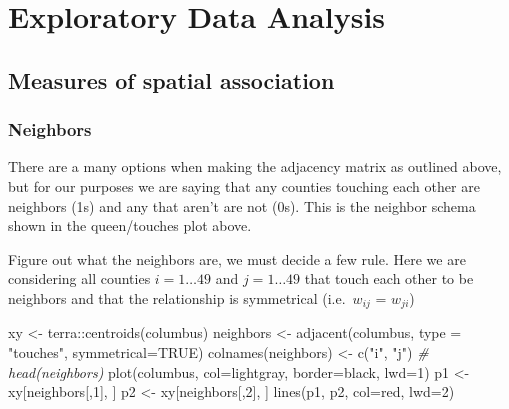 \documentclass[
]{article}
\newenvironment{Shaded}{\begin{snugshade}}{\end{snugshade}}
\newcommand{\AttributeTok}[1]{\textcolor[rgb]{0.77,0.63,0.00}{#1}}
\newcommand{\CommentTok}[1]{\textcolor[rgb]{0.56,0.35,0.01}{\textit{#1}}}
\newcommand{\ConstantTok}[1]{\textcolor[rgb]{0.00,0.00,0.00}{#1}}
\newcommand{\DecValTok}[1]{\textcolor[rgb]{0.00,0.00,0.81}{#1}}
\newcommand{\FunctionTok}[1]{\textcolor[rgb]{0.00,0.00,0.00}{#1}}
\newcommand{\NormalTok}[1]{#1}
\newcommand{\OtherTok}[1]{\textcolor[rgb]{0.56,0.35,0.01}{#1}}
\newcommand{\SpecialCharTok}[1]{\textcolor[rgb]{0.00,0.00,0.00}{#1}}
\newcommand{\StringTok}[1]{\textcolor[rgb]{0.31,0.60,0.02}{#1}}
\begin{document}
\hypertarget{exploratory-data-analysis}{%
\section{Exploratory Data Analysis}\label{exploratory-data-analysis}}

\hypertarget{measures-of-spatial-association}{%
\subsection{Measures of spatial
association}\label{measures-of-spatial-association}}

\hypertarget{neighbors}{%
\subsubsection{Neighbors}\label{neighbors}}

There are a many options when making the adjacency matrix as outlined
above, but for our purposes we are saying that any counties touching
each other are neighbors (1s) and any that aren't are not (0s). This is
the neighbor schema shown in the queen/touches plot above.

Figure out what the neighbors are, we must decide a few rule. Here we
are considering all counties \(i=1\dots49\) and \(j=1\dots49\) that
touch each other to be neighbors and that the relationship is
symmetrical (i.e.~\(w_{ij}\) = \(w_{ji}\))

\begin{Shaded}
\begin{Highlighting}[]
\NormalTok{xy }\OtherTok{\textless{}{-}}\NormalTok{ terra}\SpecialCharTok{::}\FunctionTok{centroids}\NormalTok{(columbus)}
\NormalTok{neighbors }\OtherTok{\textless{}{-}} \FunctionTok{adjacent}\NormalTok{(columbus, }\AttributeTok{type =} \StringTok{"touches"}\NormalTok{, }\AttributeTok{symmetrical=}\ConstantTok{TRUE}\NormalTok{)}
\FunctionTok{colnames}\NormalTok{(neighbors) }\OtherTok{\textless{}{-}} \FunctionTok{c}\NormalTok{(}\StringTok{"i"}\NormalTok{, }\StringTok{"j"}\NormalTok{)}
\CommentTok{\# head(neighbors)}
\FunctionTok{plot}\NormalTok{(columbus, }\AttributeTok{col=}\StringTok{\textquotesingle{}lightgray\textquotesingle{}}\NormalTok{, }\AttributeTok{border=}\StringTok{\textquotesingle{}black\textquotesingle{}}\NormalTok{, }\AttributeTok{lwd=}\DecValTok{1}\NormalTok{)}
\NormalTok{p1 }\OtherTok{\textless{}{-}}\NormalTok{ xy[neighbors[,}\DecValTok{1}\NormalTok{], ]}
\NormalTok{p2 }\OtherTok{\textless{}{-}}\NormalTok{ xy[neighbors[,}\DecValTok{2}\NormalTok{], ]}
\FunctionTok{lines}\NormalTok{(p1, p2, }\AttributeTok{col=}\StringTok{\textquotesingle{}red\textquotesingle{}}\NormalTok{, }\AttributeTok{lwd=}\DecValTok{2}\NormalTok{)}
\end{Highlighting}
\end{Shaded}
\end{document}
